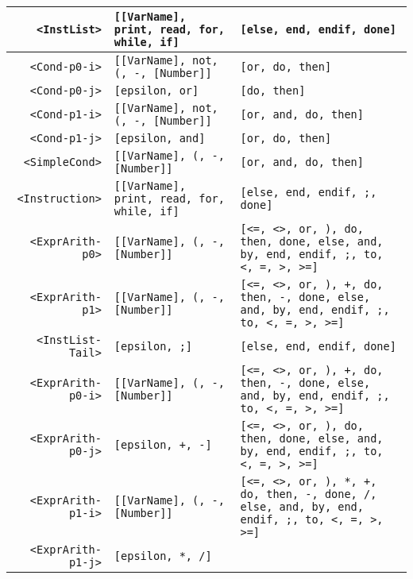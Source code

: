 \begin{longtable}{r|l|l}
\verb#<InstList># & \verb#[[VarName], print, read, for, while, if]# & \verb#[else, end, endif, done]# \\ \hline
\verb#<Cond-p0-i># & \verb#[[VarName], not, (, -, [Number]]# & \verb#[or, do, then]# \\ \hline
\verb#<Cond-p0-j># & \verb#[epsilon, or]# & \verb#[do, then]# \\ \hline
\verb#<Cond-p1-i># & \verb#[[VarName], not, (, -, [Number]]# & \verb#[or, and, do, then]# \\ \hline
\verb#<Cond-p1-j># & \verb#[epsilon, and]# & \verb#[or, do, then]# \\ \hline
\verb#<SimpleCond># & \verb#[[VarName], (, -, [Number]]# & \verb#[or, and, do, then]# \\ \hline
\verb#<Instruction># & \verb#[[VarName], print, read, for, while, if]# & \verb#[else, end, endif, ;, done]# \\ \hline
\verb#<ExprArith-p0># & \verb#[[VarName], (, -, [Number]]# & \verb#[<=, <>, or, ), do, then, done, else, and, by, end, endif, ;, to, <, =, >, >=]# \\ \hline
\verb#<ExprArith-p1># & \verb#[[VarName], (, -, [Number]]# & \verb#[<=, <>, or, ), +, do, then, -, done, else, and, by, end, endif, ;, to, <, =, >, >=]# \\ \hline
\verb#<InstList-Tail># & \verb#[epsilon, ;]# & \verb#[else, end, endif, done]# \\ \hline
\verb#<ExprArith-p0-i># & \verb#[[VarName], (, -, [Number]]# & \verb#[<=, <>, or, ), +, do, then, -, done, else, and, by, end, endif, ;, to, <, =, >, >=]# \\ \hline
\verb#<ExprArith-p0-j># & \verb#[epsilon, +, -]# & \verb#[<=, <>, or, ), do, then, done, else, and, by, end, endif, ;, to, <, =, >, >=]# \\ \hline
\verb#<ExprArith-p1-i># & \verb#[[VarName], (, -, [Number]]# & \verb#[<=, <>, or, ), *, +, do, then, -, done, /, else, and, by, end, endif, ;, to, <, =, >, >=]# \\ \hline
\verb#<ExprArith-p1-j># & \verb#[epsilon, *, /]# & \verb#[<=, <>, or, ), +, do, then, -, done, else, and, by, end, endif, ;, to, <, =, >, >=]
\end{longtable}

